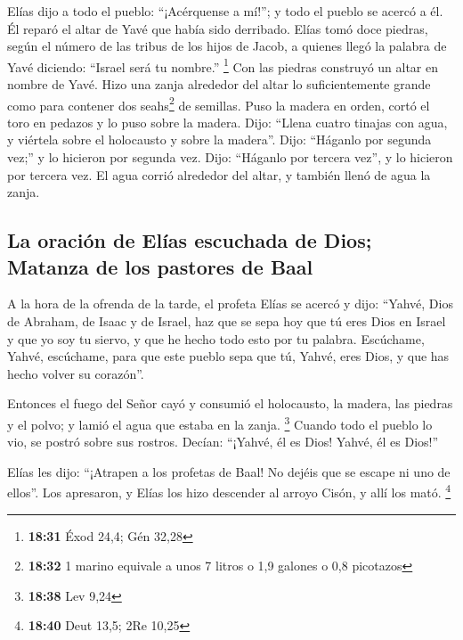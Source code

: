  Elías dijo a todo el pueblo: ``¡Acérquense a mí!''; y
todo el pueblo se acercó a él. Él reparó el altar de Yavé que había sido
derribado.  Elías tomó doce piedras, según el número de
las tribus de los hijos de Jacob, a quienes llegó la palabra de Yavé
diciendo: ``Israel será tu nombre.'' \footnote{\textbf{18:31} Éxod 24,4;
  Gén 32,28}  Con las piedras construyó un altar en
nombre de Yavé. Hizo una zanja alrededor del altar lo suficientemente
grande como para contener dos seahs\footnote{\textbf{18:32} 1 marino
  equivale a unos 7 litros o 1,9 galones o 0,8 picotazos} de semillas.
 Puso la madera en orden, cortó el toro en pedazos y lo
puso sobre la madera. Dijo: ``Llena cuatro tinajas con agua, y viértela
sobre el holocausto y sobre la madera''.  Dijo: ``Háganlo
por segunda vez;'' y lo hicieron por segunda vez. Dijo: ``Háganlo por
tercera vez'', y lo hicieron por tercera vez.  El agua
corrió alrededor del altar, y también llenó de agua la zanja.

\hypertarget{la-oraciuxf3n-de-eluxedas-escuchada-de-dios-matanza-de-los-pastores-de-baal}{%
\subsection{La oración de Elías escuchada de Dios; Matanza de los
pastores de
Baal}\label{la-oraciuxf3n-de-eluxedas-escuchada-de-dios-matanza-de-los-pastores-de-baal}}

 A la hora de la ofrenda de la tarde, el profeta Elías se
acercó y dijo: ``Yahvé, Dios de Abraham, de Isaac y de Israel, haz que
se sepa hoy que tú eres Dios en Israel y que yo soy tu siervo, y que he
hecho todo esto por tu palabra.  Escúchame, Yahvé,
escúchame, para que este pueblo sepa que tú, Yahvé, eres Dios, y que has
hecho volver su corazón''.

 Entonces el fuego del Señor cayó y consumió el
holocausto, la madera, las piedras y el polvo; y lamió el agua que
estaba en la zanja. \footnote{\textbf{18:38} Lev 9,24} 
Cuando todo el pueblo lo vio, se postró sobre sus rostros. Decían:
``¡Yahvé, él es Dios! Yahvé, él es Dios!''

 Elías les dijo: ``¡Atrapen a los profetas de Baal! No
dejéis que se escape ni uno de ellos''. Los apresaron, y Elías los hizo
descender al arroyo Cisón, y allí los mató. \footnote{\textbf{18:40}
  Deut 13,5; 2Re 10,25}

